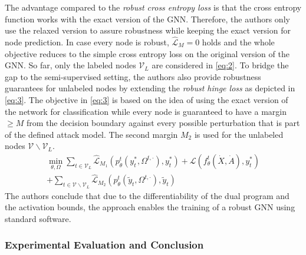 \documentclass[a4paper,preprint]{sig-alternate}
\begin{document}
The advantage compared to the \textit{robust cross entropy loss} is that the cross entropy function works with the exact
version of the GNN. \cite{Zuegner_2019}
Therefore, the authors only use the relaxed version to assure robustness while keeping the exact version for node prediction.
In case every node is robust, $\mathcal{\hat{L}}_M = 0$ holds and the whole objective reduces to the simple cross entropy loss
on the original version of the GNN. \cite{Zuegner_2019}
So far, only the labeled nodes $\mathcal{V}_L$ are considered in \ref{eq:2}. To bridge the gap to the semi-supervised setting,
the authors also provide robustness guarantees for unlabeled nodes by extending the \textit{robust hinge loss} as depicted in \ref{eq:3}.
The objective in \ref{eq:3} is based on the idea of using the exact version of the network for classification while every node is guaranteed to have a margin
$\geq M$ from the decision boundary against every possible perturbation that is part of the defined attack model. \cite{Zuegner_2019}
The second margin $M_2$ is used for the unlabeled nodes $\mathcal{V} \backslash \mathcal{V}_L$.
\begin{multline}
\label{eq:3}
    \min_{\theta, \Omega} \sum_{t \in \mathcal{V}_L} \mathcal{\hat{L}}_{M_1} (p_{\theta}^t (y_t^{\ast}, \Omega^{t, \cdot}), y_t^{\ast}) + \mathcal{L} (f_{\theta}^t (\dot{X}, \dot{A}), y_t^{\ast}) \\
    + \sum_{t \in \mathcal{V} \backslash \mathcal{V}_L} \mathcal{\hat{L}}_{M_2} (p_{\theta}^t (\tilde{y}_t, \Omega^{t, \cdot}), \tilde{y}_t)
\end{multline}
The authors conclude that due to the differentiability of the dual program and the activation bounds,
the approach enables the training of a robust GNN using standard software.

\subsubsection{Experimental Evaluation and Conclusion}
\end{document}
